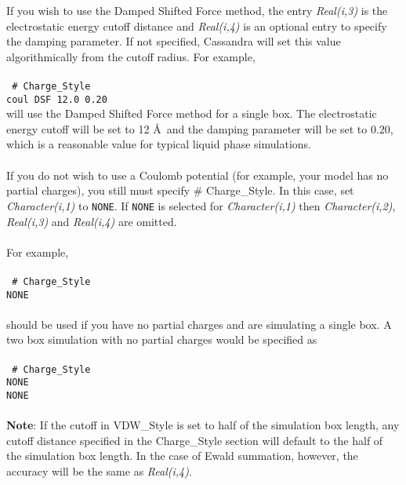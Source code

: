 If you wish to use the Damped Shifted Force method, the entry {\it Real(i,3)}
is the electrostatic energy cutoff distance and {\it Real(i,4)} is an optional
entry to specify the damping parameter. If not specified, Cassandra will
set this value algorithmically from the cutoff radius. For example, 
\\ \\
\texttt{
\# Charge\_Style \\
coul DSF 12.0 0.20}\\ 

will use the Damped Shifted Force method for a single box. The electrostatic
energy cutoff will be set to 12 \AA\ and the damping parameter will be set
to 0.20, which is a reasonable value for
typical liquid phase simulations. \\  \\
%
If you do not wish to use a Coulomb potential (for example, your model
has no partial charges), you still must specify \# Charge\_Style. In
this case, set {\it Character(i,1)} to \texttt{NONE}. If \texttt{NONE} is
selected for {\it Character(i,1)} then {\it Character(i,2)}, 
{\it  Real(i,3)} and {\it Real(i,4)} are omitted.  
\\ \\
For example, \\ \\
\texttt{
\# Charge\_Style \\
NONE} 
\\ \\
should be used if you have no partial charges and are simulating a
single box. A two box simulation with no partial charges would be
specified as \\ \\
\texttt{
\# Charge\_Style \\
NONE \\
NONE}
\\ \\
%
{\bf{Note}}: If the cutoff in VDW\_Style is set to half of the
simulation box length, any cutoff distance specified in the
Charge\_Style section will default to the half of the simulation box
length. In the case of Ewald summation, however, the accuracy will be
the same as {\it Real(i,4)}. 
%
%
